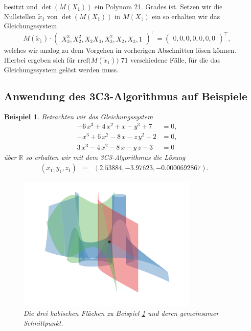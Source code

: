 \documentclass[a4paper,oneside, 11pt, openany%
]{article}
\newcommand{\R}{{\mathbb R}}
\theoremstyle{custom}
\theoremstyle{custom}
\newtheorem{example}{Beispiel}[section]
\begin{document}
besitzt und $\det(M(X_1))$ ein Polynom 21. Grades ist.
Setzen wir die Nullstellen $\tilde{x}_1$ von $\det(M(X_1))$ in $M(X_1)$ ein so erhalten wir das Gleichungssystem \begin{equation}
	M(\tilde{x}_1) \cdot \begin{pmatrix}
		X_3^3,X_2^2,X_2X_3,X_3^2,X_2,X_3,1
	\end{pmatrix}^\top
	= \begin{pmatrix}
		0,0,0,0,0,0,0
	\end{pmatrix}^\top,
\end{equation}
welches wir analog zu dem Vorgehen in vorherigen Abschnitten lösen können. Hierbei ergeben sich für $\text{rref}\big(M(\tilde{x}_1)\big)$ 71 verschiedene Fälle, für die das Gleichungssystem gelöst werden muss.
\newpage
\subsection{Anwendung des 3C3-Algorithmus auf Beispiele}
\begin{example}\label{ex:3C3_1}
	Betrachten wir das Gleichungssystem
	\begin{equation}\label{eqn:example3C3_1}
		\begin{alignedat}{-1}
			-6\,x^3+4\,x^2+x-y^3+7&=0,\\
			-x^3+6\,x^2-8\,x-z\,y^2-2&=0,\\
			3\,x^3-4\,x^2-8\,x-y\,z-3&=0
			\end{alignedat}
	\end{equation}
	über $\R$ so erhalten wir mit dem 3C3-Algorithmus die Lösung
		\begin{equation*}
	\begin{alignedat}{5}
		&\left( x_{1},y_{1},z_{1}\right) &=& \left(2.53884, -3.97623, -0.0000692867 \right).&&
	\end{alignedat}
\end{equation*}
	\begin{figure}[H]
		\includegraphics[width=0.8\textwidth]{"images/e3c3_example1.png"}
		\caption{Die drei kubischen Flächen zu Beispiel \ref{ex:3C3_1} und deren gemeinsamer Schnittpunkt.}
	\end{figure}
\end{example}
\end{document}
